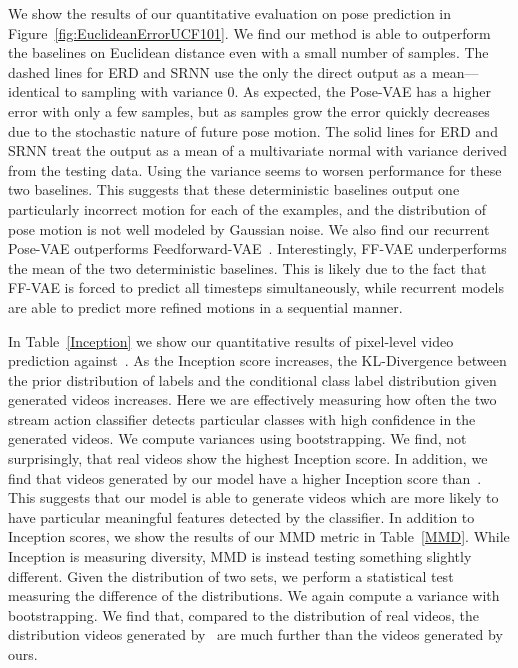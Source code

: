 We show the results of our quantitative evaluation on pose prediction in Figure~\ref{fig:EuclideanErrorUCF101}. We find our method is able to outperform the baselines on Euclidean distance even with a small number of samples. The dashed lines for ERD and SRNN use the only the direct output as a mean---identical to sampling with variance 0. As expected, the Pose-VAE has a higher error with only a few samples, but as samples grow the error quickly decreases due to the stochastic nature of future pose motion. The solid lines for ERD and SRNN treat the output as a mean of a multivariate normal with variance derived from the testing data. Using the variance seems to worsen performance for these two baselines. This suggests that these deterministic baselines output one particularly incorrect motion for each of the examples, and the distribution of pose motion is not well modeled by Gaussian noise.  We also find our recurrent Pose-VAE outperforms Feedforward-VAE~\cite{Walker16}. Interestingly, FF-VAE underperforms the mean of the two deterministic baselines. This is likely due to the fact that FF-VAE is forced to predict all timesteps simultaneously, while recurrent models are able to predict more refined motions in a sequential manner. 

In Table~\ref{Inception} we show our quantitative results of pixel-level video prediction against~\cite{Vondrick16}. As the Inception score increases, the KL-Divergence between the prior distribution of labels and the conditional class label distribution given generated videos increases. Here we are effectively measuring how often the two stream action classifier detects particular classes with high confidence in the generated videos. We compute variances using bootstrapping. We find, not surprisingly, that real videos show the highest Inception score. In addition, we find that videos generated by our model have a higher Inception score than~\cite{Vondrick16}. This suggests that our model is able to generate videos which are more likely to have particular meaningful features detected by the classifier. In addition to Inception scores, we show the results of our MMD metric in  Table~\ref{MMD}. While Inception is measuring diversity, MMD is instead testing something slightly different. Given the distribution of two sets, we perform a statistical test measuring the difference of the distributions. We again compute a variance with bootstrapping.  We find that, compared to the distribution of real videos, the distribution videos generated by~\cite{Vondrick16} are much further than the videos generated by ours.

